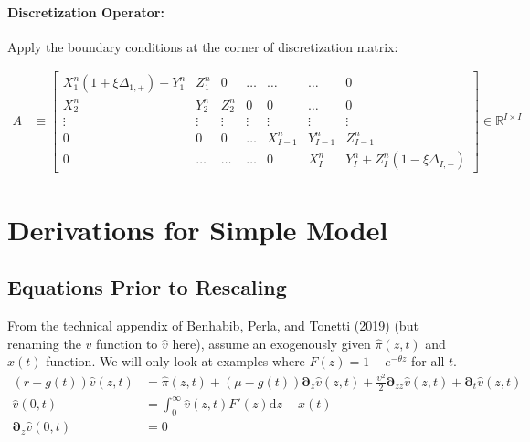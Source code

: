 \documentclass[11pt]{article}
\newcommand{\D}[1][]{\ensuremath{\boldsymbol{\partial}_{#1}}}
\newcommand{\R}{\ensuremath{\mathbb{R}}}
\newcommand{\diff}{\ensuremath{\mathrm{d}}}
\begin{document}
\paragraph{Discretization Operator:} Apply the boundary conditions at the corner of discretization matrix:

\begin{align}
A &\equiv \begin{bmatrix}
X_1^n(1+\xi\Delta_{1,+})+Y_1^n & Z_1^n & 0 & \ldots & \ldots & \ldots & 0\\
X^n_2 & Y^n_2 & Z^n_2 & 0 & 0 & \ldots & 0\\
\vdots & \vdots & \vdots & \vdots & \vdots & \vdots & \vdots\\
0 & 0 & 0 & \ldots & X^n_{I-1} & Y^n_{I-1} & Z^n_{I-1}\\
0 & \ldots & \ldots & \ldots & 0 & X_I^n & Y_I^n+Z_I^n(1-\xi\Delta_{I,-})
\end{bmatrix}\in\R^{I\times I}\label{eq:A-n}
\end{align}

\section{Derivations for Simple Model}\label{sec:simple-derivation}
\subsection{Equations Prior to Rescaling}

From the technical appendix of Benhabib, Perla, and Tonetti (2019) (but renaming the $v$ function to $\hat{v}$ here), assume an exogenously given $\hat{\pi}(z,t)$ and $x(t)$ function.  We will only look at examples where $F(z) = 1 - e^{-\theta z}$ for all $t$.
\begin{align}
(r - g(t)) \hat{v}(z,t) &= \hat{\pi}(z,t) + (\mu- g(t)) \D[z] \hat{v}(z,t) + \frac{\upsilon^2}{2} \D[zz] \hat{v}(z,t) + \D[t]\hat{v}(z,t)\label{eq:bellman-GBM-dynamic}	\\
\hat{v}(0,t) &= \int_{0}^{\infty} \hat{v}(z,t) F'(z)\diff z - x(t)\label{eq:vm-GBM-dynamic}\\
\D[z]\hat{v}(0,t) &= 0\label{eq:sp-GBM-dynamic}
\end{align}
\end{document}
